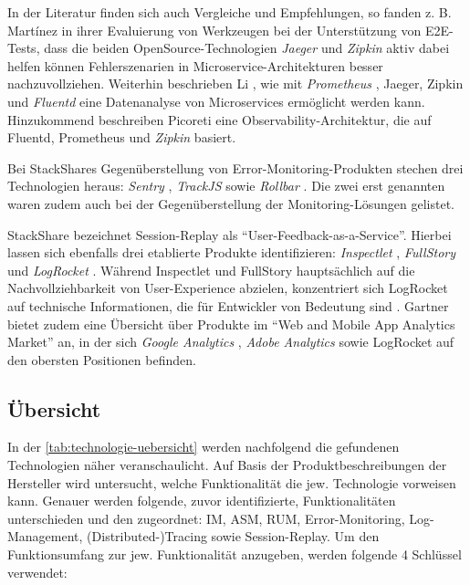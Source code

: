 In der Literatur finden sich auch Vergleiche und Empfehlungen, so fanden z. B. Mart{\'i}nez \etal \cite{ComparisonOfE2ETestingToolsForMicroservices} in ihrer Evaluierung von Werkzeugen bei der Unterstützung von E2E-Tests, dass die beiden OpenSource-Technologien \textit{Jaeger} \cite{Jaeger} und \textit{Zipkin} \cite{Zipkin} aktiv dabei helfen können Fehlerszenarien in Microservice-Architekturen besser nachzuvollziehen. Weiterhin beschrieben Li \etal \cite{ServiceMeshChallengesStateOfTheArt}, wie mit \textit{Prometheus} \cite{Prometheus}, Jaeger, Zipkin und \textit{Fluentd} \cite{Fluentd} eine Datenanalyse von Microservices ermöglicht werden kann. Hinzukommend beschreiben Picoreti \etal \cite{MultilevelObservabilityInCloudOrchestration} eine Observability-Architektur, die auf Fluentd, Prometheus und \textit{Zipkin} basiert.

Bei StackShares Gegenüberstellung von Error-Monitoring-Produkten \cite{StackShareExceptionMonitoring} stechen drei Technologien heraus: \textit{Sentry} \cite{Sentry}, \textit{TrackJS} \cite{TrackJS} sowie \textit{Rollbar} \cite{Rollbar}. Die zwei erst genannten waren zudem auch bei der Gegenüberstellung der Monitoring-Lösungen \cite{StackShareMonitoring} gelistet.

StackShare bezeichnet Session-Replay als \enquote{User-Feedback-as-a-Service}. Hierbei \cite{StackShareUserFeedbackAsAService} lassen sich ebenfalls drei etablierte Produkte identifizieren: \textit{Inspectlet} \cite{Inspectlet}, \textit{FullStory} \cite{FullStory} und \textit{LogRocket} \cite{LogRocket}. Während Inspectlet und FullStory hauptsächlich auf die Nachvollziehbarkeit von User-Experience abzielen, konzentriert sich LogRocket auf technische Informationen, die für Entwickler von Bedeutung sind \cite{Webalyt}. Gartner bietet zudem eine Übersicht \cite{GartnerWebAndMobileAppAnalytics} über Produkte im \enquote{Web and Mobile App Analytics Market} an, in der sich \textit{Google Analytics} \cite{GoogleAnalytics}, \textit{Adobe Analytics} \cite{AdobeAnalytics} sowie LogRocket auf den obersten Positionen befinden.

\subsection{Übersicht}

In der \autoref{tab:technologie-uebersicht} werden nachfolgend die gefundenen Technologien näher veranschaulicht. Auf Basis der Produktbeschreibungen der Hersteller wird untersucht, welche Funktionalität die jew. Technologie vorweisen kann. Genauer werden folgende, zuvor identifizierte, Funktionalitäten unterschieden und den zugeordnet: IM, ASM, RUM, Error-Monitoring, Log-Management, (Distributed-)Tracing sowie Session-Replay. Um den Funktionsumfang zur jew. Funktionalität anzugeben, werden folgende 4 Schlüssel verwendet:

